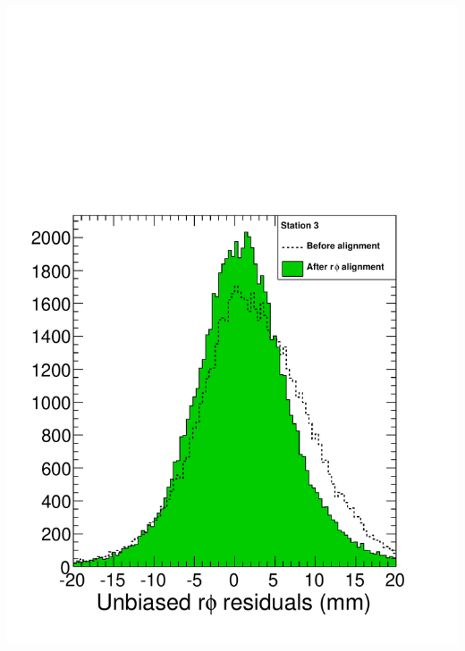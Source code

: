 \documentclass[compress]{beamer}
\begin{document}
\begin{frame}
\begin{columns}
\includegraphics[width=\linewidth]{residuals_station3.pdf}


\end{columns}
\end{frame}
\end{document}

